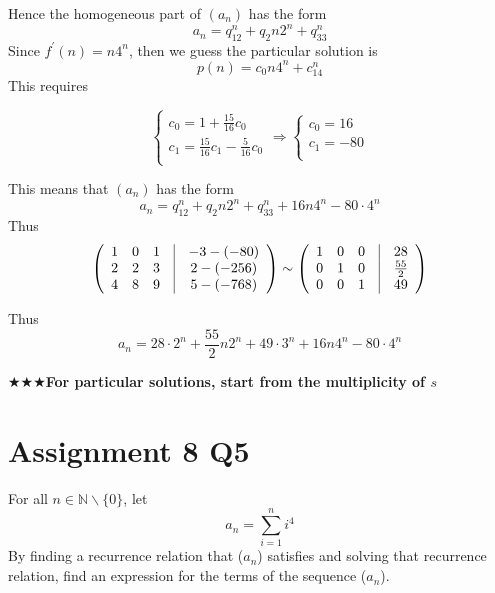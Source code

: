 Hence the homogeneous part of $(a_n)$ has the form $$a_n=q_12^n+q_2n2^n+q_33^n$$ Since $f^\prime(n)=n4^n$, then we guess the particular solution is $$p(n)=c_0n4^n+c_14^n$$ This requires

\begin{equation*}
    \begin{cases}
        c_0=1+\frac{15}{16}c_0\\
        c_1=\frac{15}{16}c_1-\frac{5}{16}c_0\\
    \end{cases}
    \Rightarrow
    \begin{cases}
        c_0=16\\
        c_1=-80\\
    \end{cases}
\end{equation*}

This means that $(a_n)$ has the form $$a_n=q_12^n+q_2n2^n+q_33^n+16n4^n-80\cdot4^n$$
Thus
\begin{equation*}
    \left(\begin{array}{ccccc}
        1&0&1&\vline&-3-(-80)\\
        2&2&3&\vline&2-(-256)\\
        4&8&9&\vline&5-(-768)\\
    \end{array}\right)
    \sim
    \left(\begin{array}{ccccc}
        1&0&0&\vline&28\\
        0&1&0&\vline&\frac{55}{2}\\
        0&0&1&\vline&49
    \end{array}\right)
\end{equation*}

Thus $$a_n=28\cdot2^n+\frac{55}{2}n2^n+49\cdot3^n+16n4^n-80\cdot4^n$$

$\bigstar\bigstar\bigstar$\textbf{For particular solutions, start from the multiplicity of $s$}

\section*{Assignment 8 Q5}
For all $n\in\mathbb{N}\backslash\{0\}$, let
$$a_n=\sum_{i=1}^ni^4$$
By finding a recurrence relation that ($a_n$) satisfies and solving that recurrence relation, find an expression for the terms of the sequence ($a_n$).

